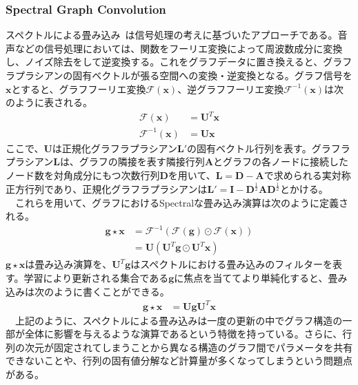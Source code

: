 \subsubsection{Spectral Graph Convolution}
スペクトルによる畳み込み~\cite{gnnbook}は信号処理の考えに基づいたアプローチである。音声などの信号処理においては、関数をフーリエ変換によって周波数成分に変換し、ノイズ除去をして逆変換する。これをグラフデータに置き換えると、グラフラプラシアンの固有ベクトルが張る空間への変換・逆変換となる。グラフ信号を$\bm{x}$とすると、グラフフーリエ変換$\mathscr{F}(\bm{x})$、逆グラフフーリエ変換$\mathscr{F}^{-1}(\bm{x})$は次のように表される。
\begin{align}
\mathscr{F}(\bm{x}) &= \bm{U}^T\bm{x}\\
\mathscr{F}^{-1}(\bm{x}) &= \bm{U}\bm{x}
\end{align}
ここで、$\bm{U}$は正規化グラフラプラシアン$\bm{L}'$の固有ベクトル行列を表す。グラフラプラシアン$\bm{L}$は、グラフの隣接を表す隣接行列$\bm{A}$とグラフの各ノードに接続したノード数を対角成分にもつ次数行列$\bm{D}$を用いて、$\bm{L} = \bm{D}-  \bm{A}$で求められる実対称正方行列であり、正規化グラフラプラシアンは$\bm{L}' = \bm{I} - \bm{D}^{\frac{1}{2}} \bm{A} \bm{D}^{\frac{1}{2}}$とかける。\\
　これらを用いて、グラフにおけるSpectralな畳み込み演算は次のように定義される。
\begin{align}
\bm{g} \star \bm{x} &= \mathscr{F}^{-1}(\mathscr{F}(\bm{g}) \odot \mathscr{F}(\bm{x}))\\
&= \bm{U}(\bm{U}^T \bm{g} \odot \bm{U}^T \bm{x})
\end{align}
$\bm{g} \star \bm{x}$は畳み込み演算を、$\bm{U}^T \bm{g}$はスペクトルにおける畳み込みのフィルターを表す。学習により更新される集合である$\bm{g}$に焦点を当ててより単純化すると、畳み込みは次のように書くことができる。\\
\begin{align}
\bm{g} \star \bm{x} &= \bm{U} \bm{g} \bm{U}^T \bm{x}
\end{align}
　上記のように、スペクトルによる畳み込みは一度の更新の中でグラフ構造の一部が全体に影響を与えるような演算であるという特徴を持っている。さらに、行列の次元が固定されてしまうことから異なる構造のグラフ間でパラメータを共有できないことや、行列の固有値分解など計算量が多くなってしまうという問題点がある。

